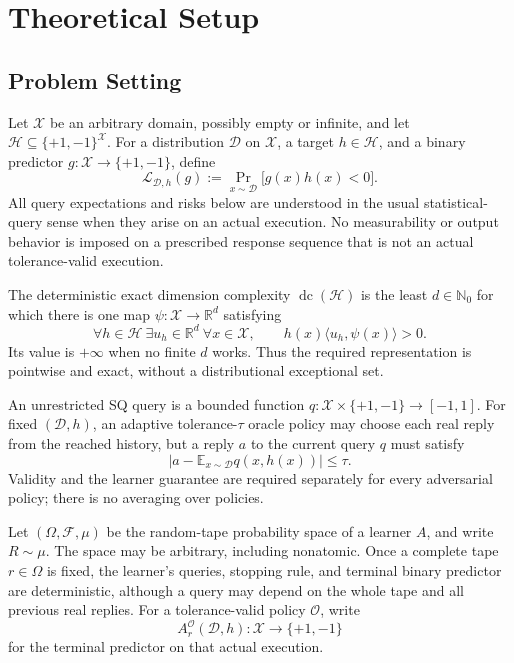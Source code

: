 \section{Theoretical Setup}
\label{sec:theoretical-setup}

\subsection{Problem Setting}

Let \(\mathcal X\) be an arbitrary domain, possibly empty or infinite, and
let \(\mathcal H\subseteq\{+1,-1\}^{\mathcal X}\).  For a distribution
\(\mathcal D\) on \(\mathcal X\), a target \(h\in\mathcal H\), and a
binary predictor \(g:\mathcal X\to\{+1,-1\}\), define
\begin{equation}
\mathcal L_{\mathcal D,h}(g)
:=\Pr_{x\sim\mathcal D}\bigl[g(x)h(x)<0\bigr].
\label{eq:binary-risk}
\end{equation}
All query expectations and risks below are understood in the usual
statistical-query sense when they arise on an actual execution.  No
measurability or output behavior is imposed on a prescribed response sequence
that is not an actual tolerance-valid execution.

The deterministic exact dimension complexity \(\operatorname{dc}(\mathcal
H)\) is the least \(d\in\mathbb N_0\) for which there is one map
\(\psi:\mathcal X\to\mathbb R^d\) satisfying
\begin{equation}
\forall h\in\mathcal H\ \exists u_h\in\mathbb R^d\ \forall x\in\mathcal X,
\qquad
h(x)\langle u_h,\psi(x)\rangle>0.
\label{eq:dc-definition}
\end{equation}
Its value is \(+\infty\) when no finite \(d\) works.  Thus the required
representation is pointwise and exact, without a distributional exceptional
set.

An unrestricted SQ query is a bounded function
\(q:\mathcal X\times\{+1,-1\}\to[-1,1]\).  For fixed
\((\mathcal D,h)\), an adaptive tolerance-\(\tau\) oracle policy may choose
each real reply from the reached history, but a reply \(a\) to the current
query \(q\) must satisfy
\begin{equation}
\left|a-\mathbb E_{x\sim\mathcal D}q(x,h(x))\right|\le\tau.
\label{eq:sq-validity}
\end{equation}
Validity and the learner guarantee are required separately for every
adversarial policy; there is no averaging over policies.

Let \((\Omega,\mathcal F,\mu)\) be the random-tape probability space of a
learner \(A\), and write \(R\sim\mu\).  The space may be arbitrary, including
nonatomic.  Once a complete tape \(r\in\Omega\) is fixed, the learner's
queries, stopping rule, and terminal binary predictor are deterministic,
although a query may depend on the whole tape and all previous real replies.
For a tolerance-valid policy \(\mathcal O\), write
\[
A_r^{\mathcal O}(\mathcal D,h):\mathcal X\to\{+1,-1\}
\]
for the terminal predictor on that actual execution.


